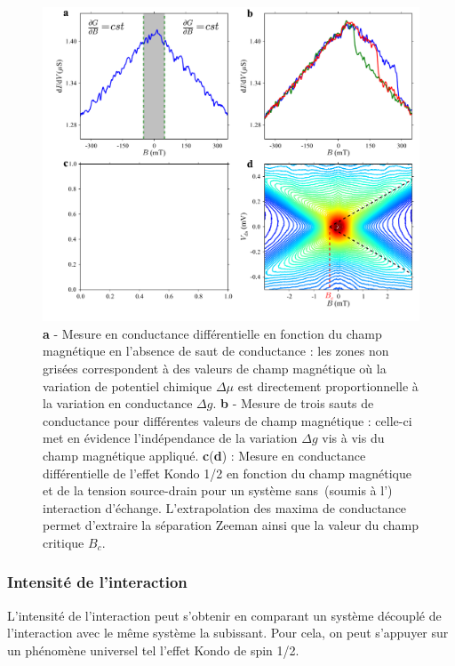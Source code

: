 \begin{figure}
\includegraphics[scale=0.45]{Resultats/AmplJump/AmplJump.pdf} 
\caption{\textbf{a} - Mesure en conductance différentielle en fonction du champ magnétique en l'absence de saut de conductance : les zones non grisées correspondent à des valeurs de champ magnétique où la variation de potentiel chimique $\Delta \mu$ est directement proportionnelle à la variation en conductance $\Delta g$. \textbf{b} - Mesure de trois sauts de conductance pour différentes valeurs de champ magnétique : celle-ci met en évidence l'indépendance de la variation $\Delta g$ vis à vis du champ magnétique appliqué. \textbf{c}(\textbf{d}) : Mesure en conductance différentielle de l'effet Kondo 1/2 en fonction du champ magnétique et de la tension source-drain pour un système sans~(soumis à l') interaction d'échange. L'extrapolation des maxima de conductance permet d'extraire la séparation Zeeman ainsi que la valeur du champ critique $B_c$.}
\label{analyse_interaction}
\end{figure}

\subsubsection{Intensité de l'interaction}
L'intensité de l'interaction peut s'obtenir en comparant un système découplé de l'interaction avec le même système la subissant. Pour cela, on peut s'appuyer sur un phénomène universel tel l'effet Kondo de spin 1/2.


